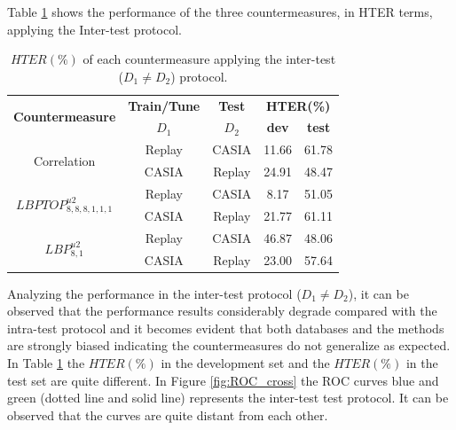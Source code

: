 Table \ref{tb:InterTest} shows the performance of the three countermeasures, in HTER terms, applying the Inter-test protocol.

\hspace{-17mm}\begin{table}[ht!]
\caption{$HTER(\%)$ of each countermeasure applying the inter-test ($D_1 \neq D_2$) protocol.}
\begin{center}
  \begin{tabular}{ | c | c | c | c  c | }
    \hline

   \multirow{2}{*}{\textbf{Countermeasure}} & \textbf{Train/Tune} & \textbf{Test} & \multicolumn{2}{c|}{\textbf{HTER(\%)}} \\ 
     & $D_1$ & $D_2$ & \textbf{dev} & \textbf{test}  \\ \hline
    
    \multirow{2}{*}{Correlation} &  Replay & CASIA & 11.66 & 61.78  \\ 
               & CASIA  & Replay & 24.91 & 48.47  \\ \hline \hline

    \multirow{2}{*}{$LBPTOP_{8,8,8,1,1,1}^{u2}$}  &  Replay  & CASIA  & 8.17 & 51.05   \\
               & CASIA  & Replay & 21.77 & 61.11   \\ \hline \hline

    \multirow{2}{*}{$LBP_{8,1}^{u2}$} &  Replay  & CASIA  & 46.87  & 48.06   \\
               & CASIA  & Replay & 23.00 & 57.64  \\
            
    \hline
  \end{tabular}
\end{center}
\label{tb:InterTest}
\end{table}

Analyzing the performance in the inter-test protocol ($D_1 \neq D_2$), it can be observed that the performance results considerably degrade compared with the intra-test protocol and it becomes evident that both databases and the methods are strongly biased indicating the countermeasures do not generalize as expected. In Table \ref{tb:InterTest} the $HTER(\%)$ in the development set and the $HTER(\%)$ in the test set are quite different. In Figure \ref{fig:ROC_cross} the ROC curves blue and green (dotted line and solid line) represents the inter-test test protocol. It can be observed that the curves are quite distant from each other.

